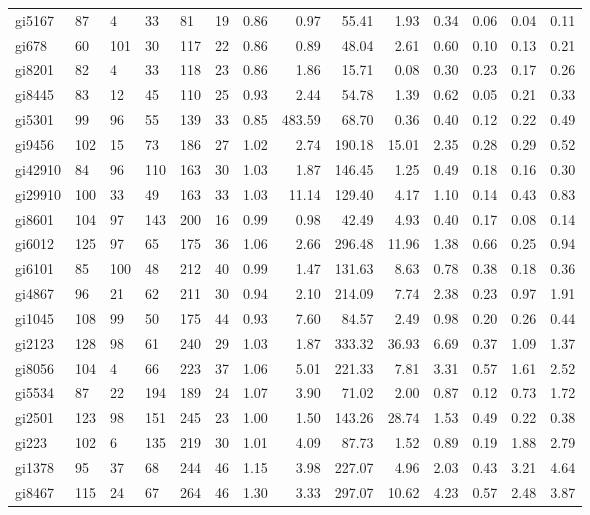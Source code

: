 {\begin{longtable}{l lllll rrrr rrrr }
gi5167 & 87 & 4 & 33 & 81 & 19 & 0.86 & 0.97 & 55.41 & 1.93 & 0.34 & 0.06 & 0.04 & 0.11 \\
gi678 & 60 & 101 & 30 & 117 & 22 & 0.86 & 0.89 & 48.04 & 2.61 & 0.60 & 0.10 & 0.13 & 0.21 \\
gi8201 & 82 & 4 & 33 & 118 & 23 & 0.86 & 1.86 & 15.71 & 0.08 & 0.30 & 0.23 & 0.17 & 0.26 \\
gi8445 & 83 & 12 & 45 & 110 & 25 & 0.93 & 2.44 & 54.78 & 1.39 & 0.62 & 0.05 & 0.21 & 0.33 \\
gi5301 & 99 & 96 & 55 & 139 & 33 & 0.85 & 483.59 & 68.70 & 0.36 & 0.40 & 0.12 & 0.22 & 0.49 \\
gi9456 & 102 & 15 & 73 & 186 & 27 & 1.02 & 2.74 & 190.18 & 15.01 & 2.35 & 0.28 & 0.29 & 0.52 \\
gi42910 & 84 & 96 & 110 & 163 & 30 & 1.03 & 1.87 & 146.45 & 1.25 & 0.49 & 0.18 & 0.16 & 0.30 \\
gi29910 & 100 & 33 & 49 & 163 & 33 & 1.03 & 11.14 & 129.40 & 4.17 & 1.10 & 0.14 & 0.43 & 0.83 \\
gi8601 & 104 & 97 & 143 & 200 & 16 & 0.99 & 0.98 & 42.49 & 4.93 & 0.40 & 0.17 & 0.08 & 0.14 \\
gi6012 & 125 & 97 & 65 & 175 & 36 & 1.06 & 2.66 & 296.48 & 11.96 & 1.38 & 0.66 & 0.25 & 0.94 \\
gi6101 & 85 & 100 & 48 & 212 & 40 & 0.99 & 1.47 & 131.63 & 8.63 & 0.78 & 0.38 & 0.18 & 0.36 \\
gi4867 & 96 & 21 & 62 & 211 & 30 & 0.94 & 2.10 & 214.09 & 7.74 & 2.38 & 0.23 & 0.97 & 1.91 \\
gi1045 & 108 & 99 & 50 & 175 & 44 & 0.93 & 7.60 & 84.57 & 2.49 & 0.98 & 0.20 & 0.26 & 0.44 \\
gi2123 & 128 & 98 & 61 & 240 & 29 & 1.03 & 1.87 & 333.32 & 36.93 & 6.69 & 0.37 & 1.09 & 1.37 \\
gi8056 & 104 & 4 & 66 & 223 & 37 & 1.06 & 5.01 & 221.33 & 7.81 & 3.31 & 0.57 & 1.61 & 2.52 \\
gi5534 & 87 & 22 & 194 & 189 & 24 & 1.07 & 3.90 & 71.02 & 2.00 & 0.87 & 0.12 & 0.73 & 1.72 \\
gi2501 & 123 & 98 & 151 & 245 & 23 & 1.00 & 1.50 & 143.26 & 28.74 & 1.53 & 0.49 & 0.22 & 0.38 \\
gi223 & 102 & 6 & 135 & 219 & 30 & 1.01 & 4.09 & 87.73 & 1.52 & 0.89 & 0.19 & 1.88 & 2.79 \\
gi1378 & 95 & 37 & 68 & 244 & 46 & 1.15 & 3.98 & 227.07 & 4.96 & 2.03 & 0.43 & 3.21 & 4.64 \\
gi8467 & 115 & 24 & 67 & 264 & 46 & 1.30 & 3.33 & 297.07 & 10.62 & 4.23 & 0.57 & 2.48 & 3.87 \\

\end{longtable}}
